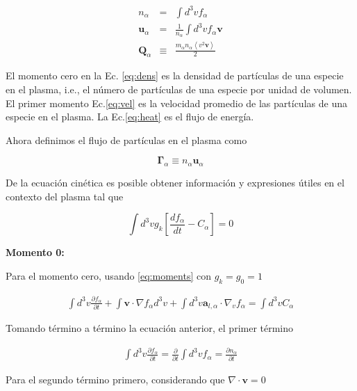   \begin{eqnarray}
    n_\alpha &=& \int d^3v f_\alpha \label{eq:dens}\\
    \textbf{u}_{\alpha} &=& \frac{1}{n_\alpha}\int d^3v f_\alpha\textbf{v} \label{eq:vel} \\
    \textbf{Q}_\alpha &\equiv& \frac{m_\alpha n_\alpha \left<v^2\textbf{v}\right>}{2}\label{eq:heat}
  \end{eqnarray}

El momento cero en la Ec. \eqref{eq:dens} es la densidad de part\'iculas de una especie en el plasma, i.e., el n\'umero de part\'iculas de una especie por unidad de volumen. El primer momento Ec.\eqref{eq:vel} es la velocidad promedio de las part\'iculas de una especie en el plasma. La Ec.\eqref{eq:heat} es el flujo de energ\'ia. 

  Ahora definimos el flujo de part\'iculas en el plasma como 
  
  \begin{equation}
    \pmb{\Gamma}_\alpha \equiv n_\alpha\textbf{u}_\alpha
  \end{equation}

  De la ecuaci\'on cin\'etica es posible obtener informaci\'on y expresiones \'utiles en el contexto del plasma tal que\cite{freidberg2014}

  \begin{equation}\label{eq:moments}
    \int d^3v g_k\left[\frac{df_\alpha}{dt} - C_\alpha\right] = 0
  \end{equation}

  
\textbf{Momento 0:}
		
Para el momento cero, usando \eqref{eq:moments} con $g_k = g_0 = 1$
		
	  \begin{eqnarray*}
      \int d^3v\frac{\partial f_\alpha}{\partial t} + \int \textbf{v}\cdot \nabla f_\alpha d^3v + \int d^3v \textbf{a}_{l,\alpha} \cdot\nabla_v f_\alpha = \int d^3v C_\alpha
		\end{eqnarray*}
		
		Tomando t\'ermino a t\'ermino la ecuaci\'on anterior, el primer t\'ermino 
		
		\begin{eqnarray*}
				\int d^3v \frac{\partial f_\alpha}{\partial t} = \frac{\partial}{\partial t}\int d^3v f_\alpha =  \frac{\partial n_\alpha}{\partial t}
		\end{eqnarray*}
		
		Para el segundo t\'ermino primero, considerando que $\nabla\cdot\textbf{v} = 0$
	
